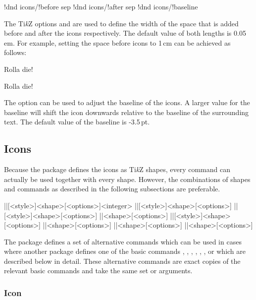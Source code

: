 \documentclass[a4paper]{article}
\begin{document}
\begin{macrodef}
!dnd icons/!before sep
!dnd icons/!after sep
!dnd icons/!baseline
\end{macrodef}
The Ti\emph{k}Z options  and  are used to define the width of the space that is added before and after the icons respectively. The default value of both lengths is 0.05\,em. For example, setting the space before icons to 1\,cm can be achieved as follows:

\begin{codeexample}
Rolla die!

Rolla die!
\end{codeexample}

The option  can be used to adjust the baseline of the icons. A larger value for the baseline will shift the icon downwards relative to the baseline of the surrounding text. The default value of the baseline is -3.5\,pt.

\subsection{Icons}

Because the package defines the icons as Ti\emph{k}Z shapes, every command can actually be used together with every shape. However, the combinations of shapes and commands as described in the following subsections are preferable.

\begin{macrodef}
|\dndiconsdie|[<style>]{<shape>}[<options>]{<integer>}
|\dndiconsability|[<style>]{<shape>}[<options>]
|\dndiconssaving|[<style>]{<shape>}[<options>]
|\dndiconsspell|{<shape>}[<options>]
|\dndiconsspellschool|[<style>]{<shape>}[<options>]
|\dndiconsdamage|{<shape>}[<options>]
|\dndiconsattack|{<shape>}[<options>]
|\dndiconscondition|{<shape>}[<options>]
\end{macrodef}
The package defines a set of alternative commands which can be used in cases where another package defines one of the basic commands \macro{\die}, \macro{\ability}, \macro{\saving}, \macro{\spell}, \macro{\spellschool}, \macro{\damage}, \macro{\attack} or \macro{\condition} which are described below in detail. These alternative commands are exact copies of the relevant basic commands and take the same set or arguments. 

\subsubsection[Icon \textbackslash die]{Icon }
\end{document}
